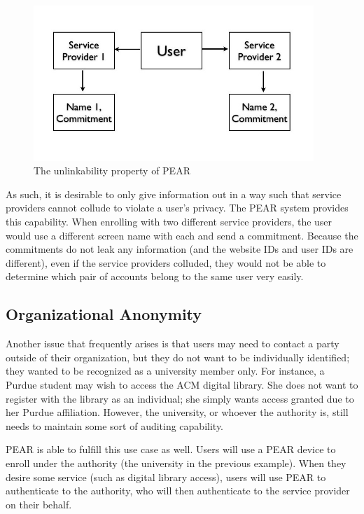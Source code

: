 \begin{figure}[!ht]
\centering
\includegraphics[width=400px]{images/pearpics.jpg}
\caption{The unlinkability property of PEAR}
\label{fig:pearunlinkability}
\end{figure}
\FloatBarrier

As such, it is desirable to only give information out in a way such that service providers cannot collude to violate
a user's privacy. The PEAR system provides this capability. When enrolling with two different service providers,
the user would use a different screen name with each and send a commitment. Because the commitments do not
leak any information (and the website IDs and user IDs are different), even if the service providers colluded, they would
not be able to determine which pair of accounts belong to the same user very easily.

\subsection{Organizational Anonymity}
Another issue that frequently arises is that users may need to contact a party outside of their organization, but
they do not want to be individually identified; they wanted to be recognized as a university member only. For instance,
a Purdue student may wish to access the ACM digital library. She does not want to register with the library as an
individual; she simply wants access granted due to her Purdue affiliation.
However, the university, or whoever the authority is, still needs to maintain some sort of auditing capability.

PEAR is able to fulfill this use case as well. Users will use a PEAR device to enroll under the authority (the university
in the previous example). When they desire some service (such as digital library access), users will use PEAR to 
authenticate to the authority, who will then authenticate to the service provider on their behalf.

